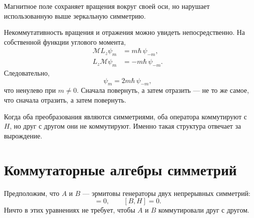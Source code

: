 Магнитное поле сохраняет вращения вокруг своей оси, но нарушает использованную выше зеркальную симметрию.

\begin{classroomqa}
\end{classroomqa}

Некоммутативность вращения и отражения можно увидеть непосредственно. На собственной функции углового момента,
\begin{align}
\mathcal M L_z\psi_m
&=m\hbar\,\psi_{-m},\\
L_z\mathcal M\psi_m
&=-m\hbar\,\psi_{-m}.
\end{align}
Следовательно,
\begin{equation}
[\mathcal M,L_z]\psi_m
=2m\hbar\,\psi_{-m},
\end{equation}
что ненулево при \(m\neq0\). Сначала повернуть, а затем отразить — не то же самое, что сначала отразить, а затем повернуть.

Когда оба преобразования являются симметриями, оба оператора коммутируют с \(H\), но друг с другом они не коммутируют. Именно такая структура отвечает за вырождение.

\begin{classroomqa}
\end{classroomqa}

\section{Коммутаторные алгебры симметрий}

Предположим, что \(A\) и \(B\) — эрмитовы генераторы двух непрерывных симметрий:
\begin{equation}
[A,H]=0,
\qquad
[B,H]=0.
\end{equation}
Ничто в этих уравнениях не требует, чтобы \(A\) и \(B\) коммутировали друг с другом.

